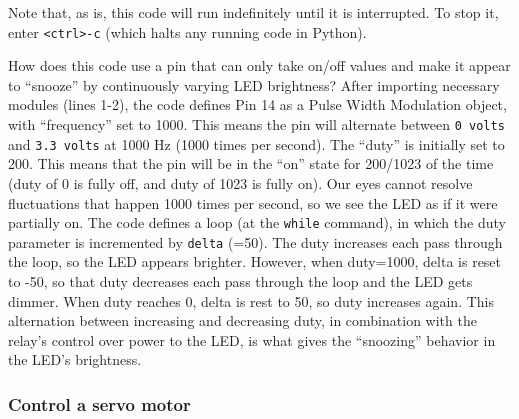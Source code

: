Note that, as is, this code will run indefinitely until it is interrupted.
To stop it, enter \texttt{<ctrl>-c} (which halts any running code in Python).
	\begin{kaobox}[frametitle=Asleep at the switch!]
		How does this code use a pin that can only take on/off values and make it appear to ``snooze'' by continuously varying LED brightness?
		After importing necessary modules (lines 1-2), the code defines Pin 14 as a Pulse Width Modulation object, with ``frequency'' set to 1000.
		This means the pin will alternate between \texttt{0 volts} and \texttt{3.3 volts} at 1000 Hz (1000 times per second).
		The ``duty'' is initially set to 200.
		This means that the pin will be in the ``on'' state for 200/1023 of the time (duty of 0 is fully off, and duty of 1023 is fully on).
		Our eyes cannot resolve fluctuations that happen 1000 times per second, so we see the LED as if it were partially on.
		The code defines a loop (at the \texttt{while} command), in which the duty parameter is incremented by \texttt{delta} (=50).
		The duty increases each pass through the loop, so the LED appears brighter.
		However, when duty=1000, delta is reset to -50, so that duty decreases each pass through the loop and the LED gets dimmer.
		When duty reaches 0, delta is rest to 50, so duty increases again.
		This alternation between increasing and decreasing duty, in combination with the relay's control over power to the LED, is what gives the ``snoozing'' behavior in the LED's brightness.
	\end{kaobox}

\subsubsection{\color{gray}\howto Control a servo motor \color{black}}





